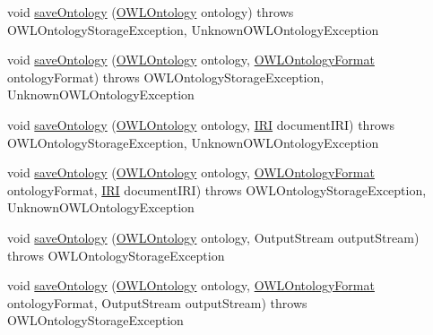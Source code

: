 \begin{DoxyCompactItemize}
\item 
void \hyperlink{classuk_1_1ac_1_1manchester_1_1cs_1_1owl_1_1owlapi_1_1_o_w_l_ontology_manager_impl_ae10c08e2ebf8bdcb885ef8c939f45369}{save\-Ontology} (\hyperlink{interfaceorg_1_1semanticweb_1_1owlapi_1_1model_1_1_o_w_l_ontology}{O\-W\-L\-Ontology} ontology)  throws O\-W\-L\-Ontology\-Storage\-Exception,             Unknown\-O\-W\-L\-Ontology\-Exception 
\item 
void \hyperlink{classuk_1_1ac_1_1manchester_1_1cs_1_1owl_1_1owlapi_1_1_o_w_l_ontology_manager_impl_a02affdd5e21f6c4f81ec0be8a658ba4c}{save\-Ontology} (\hyperlink{interfaceorg_1_1semanticweb_1_1owlapi_1_1model_1_1_o_w_l_ontology}{O\-W\-L\-Ontology} ontology, \hyperlink{classorg_1_1semanticweb_1_1owlapi_1_1model_1_1_o_w_l_ontology_format}{O\-W\-L\-Ontology\-Format} ontology\-Format)  throws O\-W\-L\-Ontology\-Storage\-Exception, Unknown\-O\-W\-L\-Ontology\-Exception 
\item 
void \hyperlink{classuk_1_1ac_1_1manchester_1_1cs_1_1owl_1_1owlapi_1_1_o_w_l_ontology_manager_impl_a392f05e642b33d57f3fb7f3af6b12a40}{save\-Ontology} (\hyperlink{interfaceorg_1_1semanticweb_1_1owlapi_1_1model_1_1_o_w_l_ontology}{O\-W\-L\-Ontology} ontology, \hyperlink{classorg_1_1semanticweb_1_1owlapi_1_1model_1_1_i_r_i}{I\-R\-I} document\-I\-R\-I)  throws O\-W\-L\-Ontology\-Storage\-Exception, Unknown\-O\-W\-L\-Ontology\-Exception 
\item 
void \hyperlink{classuk_1_1ac_1_1manchester_1_1cs_1_1owl_1_1owlapi_1_1_o_w_l_ontology_manager_impl_a29def9716b7870b8be7a4d4a688539a7}{save\-Ontology} (\hyperlink{interfaceorg_1_1semanticweb_1_1owlapi_1_1model_1_1_o_w_l_ontology}{O\-W\-L\-Ontology} ontology, \hyperlink{classorg_1_1semanticweb_1_1owlapi_1_1model_1_1_o_w_l_ontology_format}{O\-W\-L\-Ontology\-Format} ontology\-Format, \hyperlink{classorg_1_1semanticweb_1_1owlapi_1_1model_1_1_i_r_i}{I\-R\-I} document\-I\-R\-I)  throws O\-W\-L\-Ontology\-Storage\-Exception,             Unknown\-O\-W\-L\-Ontology\-Exception 
\item 
void \hyperlink{classuk_1_1ac_1_1manchester_1_1cs_1_1owl_1_1owlapi_1_1_o_w_l_ontology_manager_impl_a2a5e87e4e97f31c4d86821a13f5aa984}{save\-Ontology} (\hyperlink{interfaceorg_1_1semanticweb_1_1owlapi_1_1model_1_1_o_w_l_ontology}{O\-W\-L\-Ontology} ontology, Output\-Stream output\-Stream)  throws O\-W\-L\-Ontology\-Storage\-Exception 
\item 
void \hyperlink{classuk_1_1ac_1_1manchester_1_1cs_1_1owl_1_1owlapi_1_1_o_w_l_ontology_manager_impl_ad33668f1cb97e549201d06997ad79ad7}{save\-Ontology} (\hyperlink{interfaceorg_1_1semanticweb_1_1owlapi_1_1model_1_1_o_w_l_ontology}{O\-W\-L\-Ontology} ontology, \hyperlink{classorg_1_1semanticweb_1_1owlapi_1_1model_1_1_o_w_l_ontology_format}{O\-W\-L\-Ontology\-Format} ontology\-Format, Output\-Stream output\-Stream)  throws O\-W\-L\-Ontology\-Storage\-Exception 

\end{DoxyCompactItemize}
